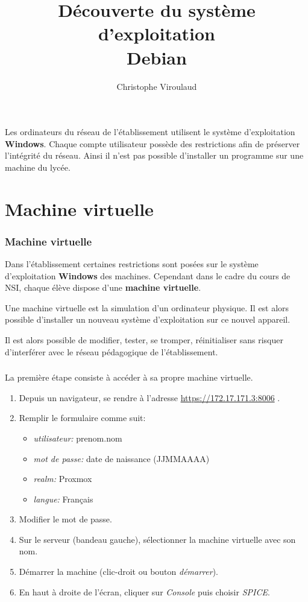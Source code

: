 \documentclass[svgnames,11pt]{beamer}
\author[]{Christophe Viroulaud}
\title{Découverte du système d'exploitation\\Debian}
\date{\framebox{\textbf{ArchMat 09}}}
\institute{Première - NSI}
\begin{document}
\begin{frame}
\titlepage
\end{frame}
\begin{frame}
    \frametitle{}

    Les ordinateurs du réseau de l'établissement utilisent le système d'exploitation \textbf{Windows}. Chaque compte utilisateur possède des restrictions afin de préserver l'intégrité du réseau. Ainsi il n'est pas possible d'installer un programme sur une machine du lycée.

\end{frame}
\section{Machine virtuelle}
\begin{frame}
    \frametitle{Machine virtuelle}
    Dans l'établissement certaines restrictions sont posées sur le système d'exploitation \textbf{Windows} des machines. Cependant dans le cadre du cours de NSI, chaque élève dispose d'une \textbf{machine virtuelle}. 
    \begin{aretenir}[]
    Une machine virtuelle est la simulation d'un ordinateur physique. Il est alors possible d'installer un nouveau système d'exploitation sur ce nouvel appareil.
    \end{aretenir}
    Il est alors possible de modifier, tester, se tromper, réinitialiser sans risquer d'interférer avec le réseau pédagogique de l'établissement.
    

\end{frame}
\begin{frame}
    \frametitle{}
La première étape consiste à accéder à sa propre machine virtuelle.
    \begin{activite}
        \begin{enumerate}
            \item Depuis un navigateur, se rendre à l'adresse \url{https://172.17.171.3:8006} .
            \item Remplir le formulaire comme suit:
                  \begin{itemize}
                      \item \emph{utilisateur:} prenom.nom
                      \item \emph{mot de passe:} date de naissance (JJMMAAAA)
                      \item \emph{realm:} Proxmox
                      \item \emph{langue:} Français
                  \end{itemize}
            \item Modifier le mot de passe.
            \item Sur le serveur (bandeau gauche), sélectionner la machine virtuelle avec son nom.
            \item Démarrer la machine (clic-droit ou bouton \emph{démarrer}).
            \item En haut à droite de l'écran, cliquer sur \emph{Console} puis choisir \emph{SPICE}.
        \end{enumerate}
    \end{activite}

\end{frame}
\end{document}

